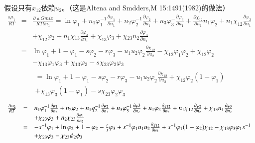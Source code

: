 \documentclass{article} %
\begin{document}
\noindent 假设只有$x_{12} $依赖$u_{2} $。（这是Altena and Smdders,M 15:1491(1982)的做法）
\[\begin{array}{rcl} {\boxed{\frac{\vartriangle \mu _{1} }{RT} } } & {=} & {\frac{\partial \vartriangle Gmix}{RT\partial n_{1} } =\ln \varphi _{1} +n_{1} \varphi _{1}^{-1} \frac{\partial \varphi _{1} }{\partial n_{1} } +n_{2} \varphi _{2}^{-1} \frac{\partial \varphi _{2} }{\partial n_{1} } +n_{3} \varphi _{3}^{-} \frac{\partial \varphi _{3} }{\partial n_{1} } +\frac{\partial \chi _{12} }{\partial n_{1} } n_{1} \varphi _{2} +n_{1} \chi _{12} \frac{\partial \varphi _{2} }{\partial n_{1} } } \\ {} & {} & {+\chi _{12} \varphi {}_{2} +n{}_{1} \chi {}_{13} \frac{\partial \varphi _{3} }{\partial n_{1} } +\chi _{13} \varphi {}_{3} +\chi {}_{23} n{}_{2} \frac{\partial \varphi _{3} }{\partial n_{1} } } \\ {} & {=} & {\ln \varphi _{1} +1-\varphi _{1} -s\varphi _{2} -r\varphi _{3} -u_{1} u_{2} \varphi _{2} \frac{\partial \chi _{12} }{\partial u_{2} } -\chi _{12} \varphi _{1} \varphi _{2} +\chi _{12} \varphi _{2} } \\ {} & {} & {-\chi {}_{13} \varphi {}_{1} \varphi {}_{3} +\chi {}_{13} \varphi {}_{3} -s\chi {}_{23} \varphi {}_{2} \varphi {}_{3} } \\ {} & {} & {\boxed{\begin{array}{l} {=\ln \varphi _{1} +1-\varphi _{1} -s\varphi _{2} -r\varphi _{3} -u_{1} u_{2} \varphi _{2} \frac{\partial \chi _{12} }{\partial u_{2} } +\chi _{12} \varphi _{2} \left(1-\varphi _{1} \right)} \\ {+\chi _{13} \varphi _{3} (1-\varphi _{1} )-s\chi _{23} \varphi _{2} \varphi _{3} } \end{array}} } \end{array}\] 
\[\begin{array}{rcl} {\frac{{\rm \Delta u}_{{\rm 2}} }{RT} } & {=} & {n_{1} \varphi _{1}^{-1} \frac{\partial \varphi _{1} }{\partial n_{3} } +n_{2} \varphi _{2} +n_{1} q_{2}^{-1} \frac{\partial \varphi _{2} }{\partial n_{3} } +n_{3} \varphi _{3}^{-1} \frac{\partial \varphi 3}{\partial n_{2} } +n_{1} \varphi _{2} \frac{\partial \chi _{12} }{\partial n_{2} } +n_{1} \chi _{12} \frac{\partial \varphi _{2} }{\partial n_{2} } +\chi _{13} n_{1} \frac{\partial \varphi _{3} }{\partial n_{2} } } \\ {} & {} & {+\chi _{23} \varphi {}_{3} +n{}_{2} \chi {}_{23} \frac{\partial \varphi _{3} }{\partial n_{2} } } \\ {} & {=} & {-s^{-1} \varphi _{1} +\ln \varphi _{2} +1-\varphi _{2} -\frac{r}{s} \varphi _{3} +s^{-1} \varphi _{1} u_{1} u_{2} \frac{\partial \chi _{12} }{\partial u_{2} } +s^{-1} \varphi _{1} (1-\varphi _{2} )\chi _{12} -\chi _{13} \varphi _{3} \varphi _{1} s^{-1} } \\ {} & {} & {+\chi {}_{23} \varphi {}_{3} -\chi {}_{23} \phi {}_{2} \phi {}_{3} } \end{array}\] 
\end{document}
